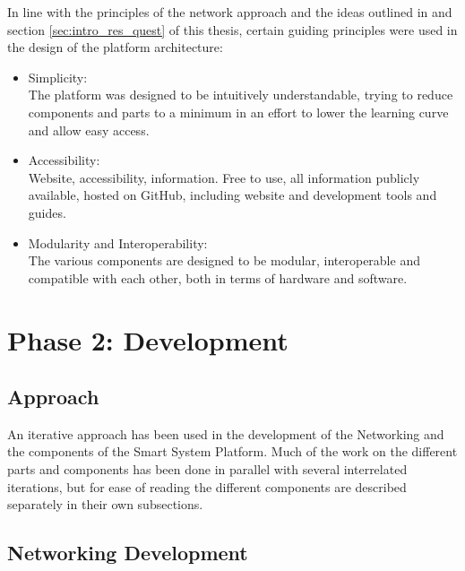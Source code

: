 In line with the principles of the network approach and the ideas outlined in \citet[]{dahal_designing_2024} and section \ref{sec:intro_res_quest} of this thesis, certain guiding principles were used in the design of the platform architecture: 

\begin{itemize}
    \item Simplicity:\\
    The platform was designed to be intuitively understandable, trying to reduce components and parts to a minimum in an effort to lower the learning curve and allow easy access.
    \item Accessibility:\\
    Website, accessibility, information. Free to use, all information publicly available, hosted on GitHub, including website and development tools and guides.
    \item Modularity and Interoperability:\\
    The various components are designed to be modular, interoperable and compatible with each other, both in terms of hardware and software. 
\end{itemize}

\section{\label{sec:methods_ph2}Phase 2: Development}

\subsection{\label{sec:methods_approach}Approach}

An iterative approach has been used in the development of the Networking and the components of the Smart System Platform. Much of the work on the different parts and components has been done in parallel with several interrelated iterations, but for ease of reading the different components are described separately in their own subsections.

\subsection{\label{sec:methods_net_dev}Networking Development}


